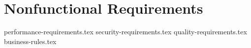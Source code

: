 \chapter{Nonfunctional Requirements} \label{chap:nonfunc_requirements}

{performance-requirements.tex}
{security-requirements.tex}
{quality-requirements.tex}
{business-rules.tex}
